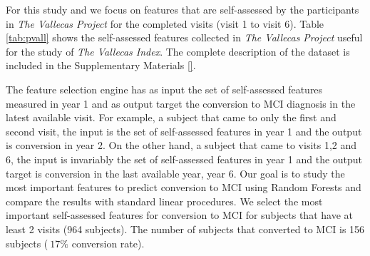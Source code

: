 \documentclass[preprint,12pt]{elsarticle}
\begin{document}
For this study and we focus on features that are self-assessed by the participants in \emph{The Vallecas Project} for the completed visits (visit 1 to visit 6). Table \ref{tab:pvall} shows the self-assessed features collected in \emph{The Vallecas Project} useful for the study of \emph{The Vallecas Index}. The complete description of the dataset is included in the Supplementary Materials \ref{}.

The feature selection engine has as input the set of self-assessed features measured in year 1 and as output target the conversion to MCI diagnosis in the latest available visit. For example, a subject that came to only the first and second visit, the input is the set of self-assessed features in year 1 and the output is conversion in year 2. On the other hand, a subject that came to visits 1,2 and 6, the input is invariably the set of self-assessed features in year 1 and the output target is conversion in the last available year, year 6. %
Our goal is to study the most important features to predict conversion to MCI using Random Forests and compare the results with standard linear procedures. We select the most important self-assessed features for conversion to MCI for subjects that have at least 2 visits (964 subjects). The number of subjects that converted to MCI is 156 subjects ($~17\%$ conversion rate). 
\end{document}
